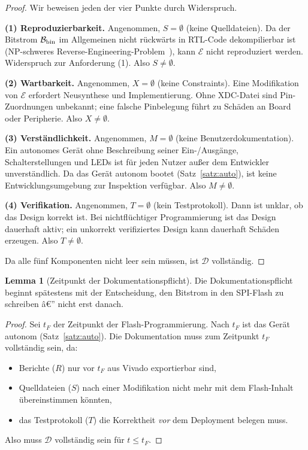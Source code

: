 ﻿\documentclass[a4paper,12pt]{article}
\theoremstyle{definition}
\newtheorem{lemma}{Lemma}
\begin{document}
\begin{proof}
    Wir beweisen jeden der vier Punkte durch Widerspruch.

    \textbf{(1) Reproduzierbarkeit.}
    Angenommen, $S = \emptyset$ (keine Quelldateien). Da der Bitstrom
    $\mathcal{B}_{\rm bin}$ im Allgemeinen nicht rückwärts in RTL-Code
    dekompilierbar ist (NP-schweres Reverse-Engineering-Problem~\cite{quadrant2020}),
    kann $\mathcal{E}$ nicht reproduziert werden. Widerspruch zur Anforderung (1).
    Also $S \neq \emptyset$.

    \textbf{(2) Wartbarkeit.}
    Angenommen, $X = \emptyset$ (keine Constraints). Eine Modifikation von
    $\mathcal{E}$ erfordert Neusynthese und Implementierung. Ohne XDC-Datei
    sind Pin-Zuordnungen unbekannt; eine falsche Pinbelegung führt zu
    Schäden an Board oder Peripherie. Also $X \neq \emptyset$.

    \textbf{(3) Verständlichkeit.}
    Angenommen, $M = \emptyset$ (keine Benutzerdokumentation). Ein autonomes
    Gerät ohne Beschreibung seiner Ein-/Ausgänge, Schalterstellungen und
    LEDs ist für jeden Nutzer außer dem Entwickler unverständlich.
    Da das Gerät autonom bootet (Satz~\ref{satz:auto}), ist keine
    Entwicklungsumgebung zur Inspektion verfügbar. Also $M \neq \emptyset$.

    \textbf{(4) Verifikation.}
    Angenommen, $T = \emptyset$ (kein Testprotokoll). Dann ist unklar, ob
    das Design korrekt ist. Bei nichtflüchtiger Programmierung ist das
    Design dauerhaft aktiv; ein unkorrekt verifiziertes Design kann
    dauerhaft Schäden erzeugen. Also $T \neq \emptyset$.

    Da alle fünf Komponenten nicht leer sein müssen, ist $\mathcal{D}$ vollständig.
    \qedhere
\end{proof}

\begin{lemma}[Zeitpunkt der Dokumentationspflicht]
    \label{lem:zeitpunkt}
    Die Dokumentationspflicht beginnt spätestens mit der Entscheidung,
    den Bitstrom in den SPI-Flash zu schreiben â€” nicht erst danach.
\end{lemma}

\begin{proof}
    Sei $t_F$ der Zeitpunkt der Flash-Programmierung. Nach $t_F$ ist das
    Gerät autonom (Satz~\ref{satz:auto}). Die Dokumentation muss zum
    Zeitpunkt $t_F$ vollständig sein, da:
    \begin{itemize}
        \item Berichte ($R$) nur vor $t_F$ aus Vivado exportierbar sind,
        \item Quelldateien ($S$) nach einer Modifikation nicht mehr mit
              dem Flash-Inhalt übereinstimmen könnten,
        \item das Testprotokoll ($T$) die Korrektheit \emph{vor} dem
              Deployment belegen muss.
    \end{itemize}
    Also muss $\mathcal{D}$ vollständig sein für $t \leq t_F$. \qedhere
\end{proof}
\end{document}
